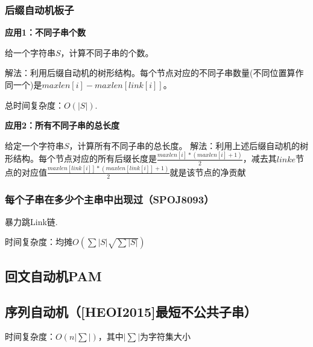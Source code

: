 \documentclass{article}
\begin{document}
\subsubsection{后缀自动机板子}
\textbf{应用1：不同子串个数}\par
给一个字符串$S$，计算不同子串的个数。\par
解法：利用后缀自动机的树形结构。每个节点对应的不同子串数量(不同位置算作同一个)是$maxlen[i]-maxlen[link[i]]$。\par
总时间复杂度：$O(|S|)$.\par
\textbf{应用2：所有不同子串的总长度}\par
给定一个字符串$S$，计算所有不同子串的总长度。
解法：利用上述后缀自动机的树形结构。每个节点对应的所有后缀长度是$\frac{maxlen[i]\ast (maxlen[i]+1)}{2}$，减去其$linke$节点的对应值$\frac{maxlen[link[i]]\ast (maxlen[link[i]]+1)}{2}$就是该节点的净贡献

\subsubsection{每个子串在多少个主串中出现过（SPOJ8093）}
暴力跳Link链.\par
时间复杂度：$均摊O(\sum |S|\sqrt{\sum |S|})$



\subsection{回文自动机PAM}

\subsection{序列自动机（[HEOI2015]最短不公共子串）}
时间复杂度：$O(n|\sum|)$，其中$|\sum|$为字符集大小
\end{document}

